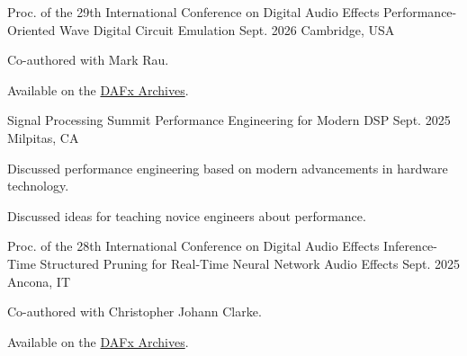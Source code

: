 

\begin{cventries}

  \cventry
    {Proc. of the 29th International Conference on Digital Audio Effects} %
    {Performance-Oriented Wave Digital Circuit Emulation} %
    {Sept. 2026} %
    {Cambridge, USA} %
    {
      \begin{cvitems} %
        \item {Co-authored with Mark Rau.}
        \item {Available on the \href{https://dafx26.mit.edu/assets/papers/DAFx26_paper_23.pdf}{DAFx Archives}.}
      \end{cvitems}
    }

  \cventry
    {Signal Processing Summit} %
    {Performance Engineering for Modern DSP} %
    {Sept. 2025} %
    {Milpitas, CA} %
    {
      \begin{cvitems} %
        \item {Discussed performance engineering based on modern advancements in hardware technology.}
        \item {Discussed ideas for teaching novice engineers about performance.}
      \end{cvitems}
    }

  \cventry
    {Proc. of the 28th International Conference on Digital Audio Effects} %
    {Inference-Time Structured Pruning for Real-Time Neural Network Audio Effects} %
    {Sept. 2025} %
    {Ancona, IT} %
    {
      \begin{cvitems} %
        \item {Co-authored with Christopher Johann Clarke.}
        \item {Available on the \href{https://dafx25.dii.univpm.it/wp-content/uploads/2025/07/DAFx25_paper_78.pdf}{DAFx Archives}.}
      \end{cvitems}
    }


\end{cventries}
